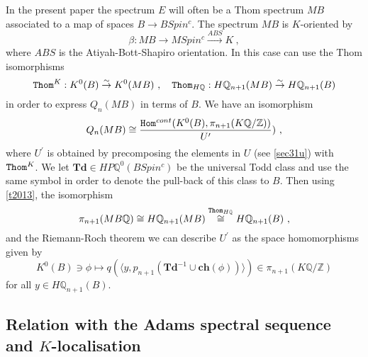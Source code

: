 \documentclass[12pt]{article}
\newcommand{\Thom}{{\tt Thom}}
\newcommand{\Z}{{\mathbb{Z}}}
\newcommand{\Q}{{\mathbb{Q}}}
\newcommand{\Hom}{{\tt Hom}}
\newcommand{\Td}{{\mathbf{Td}}}
\newcommand{\ch}{{\mathbf{ch}}}
\begin{document}
In the present paper the spectrum $E$ will often be a Thom spectrum $MB$  associated to 
  a map of spaces $B\to BSpin^{c}$. The spectrum $MB$ is   $K$-oriented by
\begin{equation}\label{betadef}\beta:MB\to MSpin^{c}\xrightarrow{ABS} K\ ,\end{equation}
where $ABS$ is the Atiyah-Bott-Shapiro orientation.  
In this case  can use the  Thom isomorphisms
$$\Thom^{K}:K^{0}(B)\stackrel{\sim}{\to} K^{0}(MB)\ , \quad 
\Thom_{H\Q}:H\Q_{n+1}(MB)\stackrel{\sim}{\to}  H\Q_{n+1}(B) 
$$
in order to express $Q_{n}(MB)$ in terms of $B$.
We have an isomorphism
\begin{equation}\label{spacerep1}Q_{n}(MB)\cong \frac{\Hom^{cont}(K^{0} (B ),\pi_{n+1}(K\Q/\Z))}{U^{\prime}})\ ,\end{equation}
 where $U^{\prime}$ is obtained by precomposing the elements in $U$ (see \eqref{sec31u}) with $\Thom^{K}$.
We let $\Td\in HP\Q^{0}( BSpin^{c})$ be the universal Todd class and use the same symbol in order to denote the pull-back of this class to $B$.
Then using \eqref{t2013}, the  isomorphism 
$$\pi_{n+1}(MB\Q)\cong H\Q_{n+1}(MB)\stackrel{\Thom_{H\Q}}{\cong} H\Q_{n+1}(B)\ ,$$  and the Riemann-Roch theorem we can describe $U^{\prime}$ as the space homomorphisms given by
\begin{equation}\label{localthomformula}K^{0}(B)\ni \phi\mapsto q(\langle  y , p_{n+1}(\Td^{-1}\cup \ch(\phi))\rangle)\in \pi_{n+1}(K\Q/\Z)\end{equation}
for all $y\in H\Q_{n+1}(B)$.
 










\subsection{Relation with the Adams spectral sequence and $K$-localisation}\label{secneu8}
\end{document}
